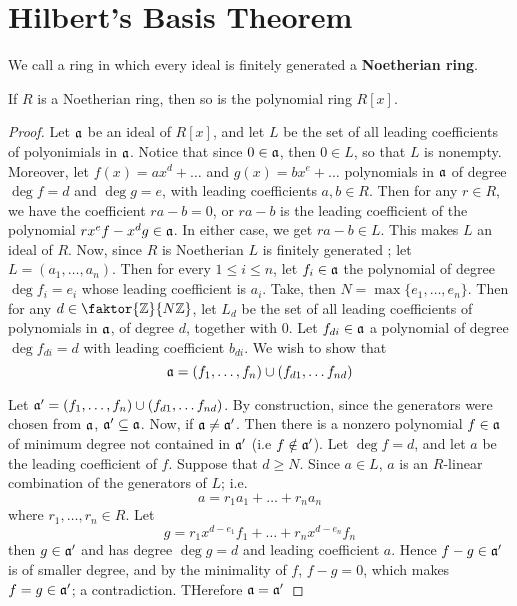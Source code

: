 \section{Hilbert's Basis Theorem}

\begin{definition}
    We call a ring in which every ideal is finitely generated a
    \textbf{Noetherian ring}.
\end{definition}

\begin{theorem}\label{1.4.1}
    If $R$ is a Noetherian ring, then so is the polynomial ring $R[x]$.
\end{theorem}
\begin{proof}
    Let $\mathfrak{a}$ be an ideal of  $R[x]$, and let $L$ be the set of all leading
    coefficients of polyonimials in $\mathfrak{a}$. Notice that since  $0 \in \mathfrak{a}$, then  $0
    \in L$, so that $L$ is nonempty. Moreover, let $f(x)=ax^d+\dots$ and
    $g(x)=bx^e+\dots$ polynomials in $\mathfrak{a}$ of degree  $\deg{f}=d$ and $\deg{g}=e$,
    with leading coefficients $a, b \in R$. Then for any  $r \in R$, we have the
    coefficient  $ra-b=0$, or  $ra-b$ is the leading coefficient of the
    polynomial  $rx^ef-x^dg \in \mathfrak{a}$. In either case, we get  $ra-b \in L$. This
    makes  $L$ an ideal of  $R$. Now, since  $R$ is Noetherian  $L$ is finitely
    generated ; let $L=(a_1, \dots, a_n)$. Then for every $1 \leq  i \leq n$,
    let  $f_i \in \mathfrak{a}$ the polynomial of degree  $\deg{f_i}=e_i$ whose leading
    coefficient is $a_i$. Take, then  $N=\max{\{e_1, \dots, e_n\}}$. Then for
    any $d \in \faktor{\Z}{N\Z}$, let $L_d$ be the set of all leading
    coefficients of polynomials in  $\mathfrak{a}$, of degree $d$, together with $0$. Let
    $f_{di} \in \mathfrak{a}$ a polynomial of degree $\deg{f_{di}}=d$ with leading
    coefficient $b_{di}$. We wish to show that
    \begin{equation*}
        \mathfrak{a}=(f_1, \dots, f_n) \cup (f_{d1}, \dots f_{nd})
    \end{equation*}

    Let $\mathfrak{a}'=(f_1, \dots, f_n) \cup (f_{d1}, \dots f_{nd})$. By construction,
    since the generators were chosen from $\mathfrak{a}$,  $\mathfrak{a}' \subseteq \mathfrak{a}$. Now, if
    $\mathfrak{a} \neq \mathfrak{a}'$. Then there is a nonzero polynomial $f \in \mathfrak{a}$ of minimum degree
     not contained in $\mathfrak{a}'$  (i.e $f \notin \mathfrak{a}'$). Let $\deg{f}=d$, and let $a$ be
     the leading coefficient of  $f$. Suppose that  $d \geq N$. Since  $a \in
     L$, $a$ is an  $R$-linear combination of the generators of  $L$; i.e.
     \begin{equation*}
         a=r_1a_1+\dots+r_na_n
     \end{equation*}
     where $r_1, \dots, r_n \in R$. Let
     \begin{equation*}
        g=r_1x^{d-e_1}f_1+\dots+r_nx^{d-e_n}f_n
     \end{equation*}
     then $g \in \mathfrak{a}'$ and has degree $\deg{g}=d$ and leading coefficient $a$.
     Hence  $f-g \in \mathfrak{a}'$ is of smaller degree, and by the minimality of  $f$,
     $f-g=0$, which makes  $f=g \in \mathfrak{a}'$; a contradiction. THerefore $\mathfrak{a}=\mathfrak{a}'$


\end{proof}
